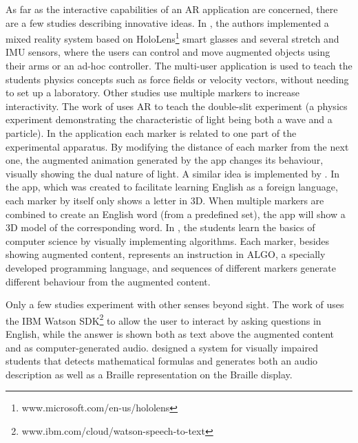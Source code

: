 As far as the interactive capabilities of an AR application are concerned, there are a few studies describing innovative ideas. In \citep{khan2018mathland}, the authors implemented a mixed reality system based on HoloLens\footnote{www.microsoft.com/en-us/hololens} smart glasses and several stretch and \gls{IMU} sensors, where the users can control and move augmented objects using their arms or an ad-hoc controller. The multi-user application is used to teach the students physics concepts such as force fields or velocity vectors, without needing to set up a laboratory.
Other studies use multiple markers to increase interactivity. The work of  \citet{wang2018augmented} uses AR to teach the double-slit experiment (a physics experiment demonstrating the characteristic of light being both a wave and a particle). In the application each marker is related to one part of the experimental apparatus. By modifying the distance of each marker from the next one, the augmented animation generated by the app changes its behaviour, visually showing the dual nature of light.
A similar idea is implemented by \citet{boonbrahm2015using}. In the app, which was created to facilitate learning English as a foreign language, each marker by itself only shows a letter in 3D. When multiple markers are combined to create an English word (from a predefined set), the app will show a 3D model of the corresponding word.
In \citep{gardeli2018effect}, the students learn the basics of computer science by visually implementing algorithms. Each marker, besides showing augmented content, represents an instruction in ALGO, a specially developed programming language, and sequences of different markers generate different behaviour from the augmented content.

Only a few studies experiment with other senses beyond sight. The work of \citet{kenoui2020teach} uses the IBM Watson SDK\footnote{www.ibm.com/cloud/watson-speech-to-text} to allow the user to interact by asking questions in English, while the answer is shown both as text above the augmented content and as computer-generated audio. \citet{mikulowski2020multi} designed a system for visually impaired students that detects mathematical formulas and generates both an audio description as well as a Braille representation on the Braille display.
 
